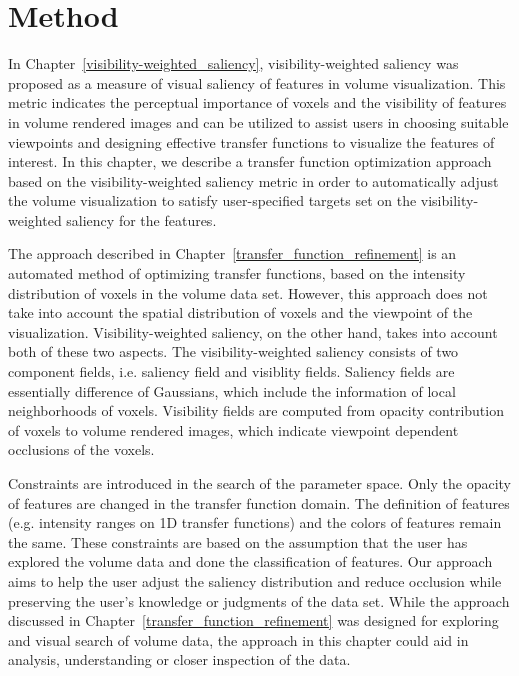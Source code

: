\section{Method}
In Chapter~\ref{visibility-weighted_saliency}, visibility-weighted saliency was proposed as a measure of visual saliency of features in volume visualization. This metric indicates the perceptual importance of voxels and the visibility of features in volume rendered images and can be utilized to assist users in choosing suitable viewpoints and designing effective transfer functions to visualize the features of interest.
In this chapter, we describe a transfer function optimization approach based on the visibility-weighted saliency metric in order to automatically adjust the volume visualization to satisfy user-specified targets set on the visibility-weighted saliency for the features.

The approach described in Chapter~\ref{transfer_function_refinement} is an automated method of optimizing transfer functions, based on the intensity distribution of voxels in the volume data set. However, this approach does not take into account the spatial distribution of voxels and the viewpoint of the visualization. Visibility-weighted saliency, on the other hand, takes into account both of these two aspects. The visibility-weighted saliency consists of two component fields, i.e. saliency field and visiblity fields. Saliency fields are essentially difference of Gaussians, which include the information of local neighborhoods of voxels.
Visibility fields are computed from opacity contribution of voxels to volume rendered images, which indicate viewpoint dependent occlusions of the voxels.

Constraints are introduced in the search of the parameter space. Only the opacity of features are changed in the transfer function domain. The definition of features (e.g. intensity ranges on 1D transfer functions) and the colors of features remain the same.
These constraints are based on the assumption that the user has explored the volume data and done the classification of features.
Our approach aims to help the user adjust the saliency distribution and reduce occlusion while preserving the user's knowledge or judgments of the data set.
While the approach discussed in Chapter~\ref{transfer_function_refinement} was designed for exploring and visual search of volume data, the approach in this chapter could aid in analysis, understanding or closer inspection of the data.

